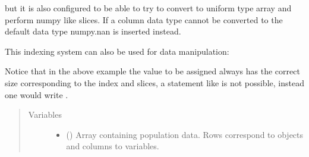 \documentclass[letterpaper,10pt,english]{sphinxmanual}
\begin{document}
\begin{fulllineitems}
but it is also configured to be able to try to convert to uniform type array and perform numpy like slices. If a column data type cannot be converted to the default data type numpy.nan is inserted instead.

%
\begin{sphinxVerbatim}[commandchars=\\\{\}]
  \PYG{p}{[}\PYG{p}{]}

  \PYG{p}{[}\PYG{p}{]}
\end{sphinxVerbatim}

This indexing system can also be used for data manipulation:

%
\begin{sphinxVerbatim}[commandchars=\\\{\}]
\PYG{p}{[}\PYG{p}{]}  
\PYG{p}{[}\PYG{p}{]}  
\PYG{p}{[}\PYG{p}{]}  
\PYG{p}{[}\PYG{p}{]}  
\PYG{p}{[}\PYG{p}{]}  
\end{sphinxVerbatim}

Notice that in the above example the value to be assigned always has the correct size corresponding to the index and slices, a statement like  is not possible, instead one would write .
\begin{quote}\begin{description}
\item[{Variables}] \leavevmode\begin{itemize}
\item {} 
 () \textendash{} Array containing population data. Rows correspond to objects and columns to variables.


\end{itemize}
\end{description}
\end{quote}
\end{fulllineitems}
\end{document}
